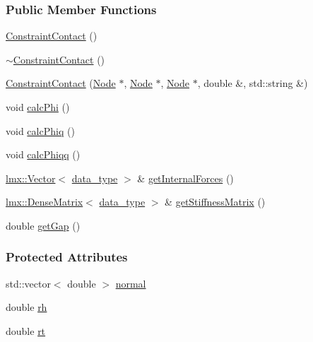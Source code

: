\subsubsection*{Public Member Functions}
\begin{DoxyCompactItemize}
\item 
\hyperlink{classmknix_1_1_constraint_contact_a76498ab5af03df8fd8c850f67ac54d33}{Constraint\+Contact} ()
\item 
\hyperlink{classmknix_1_1_constraint_contact_a2570dc3ad5c593871f1d5dd4e6302f07}{$\sim$\+Constraint\+Contact} ()
\item 
\hyperlink{classmknix_1_1_constraint_contact_abfcda7ac9dc63a790078f2fb26497a6e}{Constraint\+Contact} (\hyperlink{classmknix_1_1_node}{Node} $\ast$, \hyperlink{classmknix_1_1_node}{Node} $\ast$, \hyperlink{classmknix_1_1_node}{Node} $\ast$, double \&, std\+::string \&)
\item 
void \hyperlink{classmknix_1_1_constraint_contact_a21a89037754ef5d968bda199ad3f1858}{calc\+Phi} ()
\item 
void \hyperlink{classmknix_1_1_constraint_contact_a88c495ea01a5f8f8807dd72ae3e7240f}{calc\+Phiq} ()
\item 
void \hyperlink{classmknix_1_1_constraint_contact_ad9b4db34bf76f2d8ea9532d5d3e0449f}{calc\+Phiqq} ()
\item 
\hyperlink{classlmx_1_1_vector}{lmx\+::\+Vector}$<$ \hyperlink{namespacemknix_a16be4b246fbf2cceb141e3a179111020}{data\+\_\+type} $>$ \& \hyperlink{classmknix_1_1_constraint_contact_ae4ebea11a39b4cf89ce317154abc99e3}{get\+Internal\+Forces} ()
\item 
\hyperlink{classlmx_1_1_dense_matrix}{lmx\+::\+Dense\+Matrix}$<$ \hyperlink{namespacemknix_a16be4b246fbf2cceb141e3a179111020}{data\+\_\+type} $>$ \& \hyperlink{classmknix_1_1_constraint_contact_abb4cb7497d2cbef540add289fdf8492e}{get\+Stiffness\+Matrix} ()
\item 
double \hyperlink{classmknix_1_1_constraint_contact_a4fcfe47c1421fd375ff806b8ef411f47}{get\+Gap} ()
\end{DoxyCompactItemize}
\subsubsection*{Protected Attributes}
\begin{DoxyCompactItemize}
\item 
std\+::vector$<$ double $>$ \hyperlink{classmknix_1_1_constraint_contact_a06ba5460d950b98b85226e7b9b520df2}{normal}
\item 
double \hyperlink{classmknix_1_1_constraint_contact_a86b0413ea70c74a38f8610a88cba48c6}{rh}
\item 
double \hyperlink{classmknix_1_1_constraint_contact_a0a2b6bbee4925e12f4921aa58f0f3426}{rt}
\end{DoxyCompactItemize}


